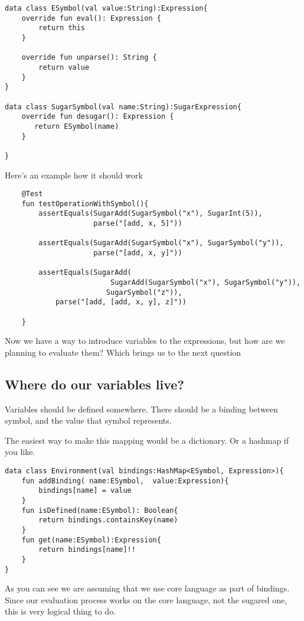 \documentclass[11pt]{article}
\begin{document}
\begin{verbatim}
data class ESymbol(val value:String):Expression{
    override fun eval(): Expression {
        return this
    }

    override fun unparse(): String {
        return value
    }
}

data class SugarSymbol(val name:String):SugarExpression{
    override fun desugar(): Expression {
       return ESymbol(name)
    }

}
\end{verbatim}
Here's an example how it should work
\begin{verbatim}
    @Test
    fun testOperationWithSymbol(){
        assertEquals(SugarAdd(SugarSymbol("x"), SugarInt(5)),
                     parse("[add, x, 5]"))

        assertEquals(SugarAdd(SugarSymbol("x"), SugarSymbol("y")),
                     parse("[add, x, y]"))

        assertEquals(SugarAdd(
                         SugarAdd(SugarSymbol("x"), SugarSymbol("y")),
                        SugarSymbol("z")),
            parse("[add, [add, x, y], z]"))

    }
\end{verbatim}
Now we have a way to introduce variables to the expressions, but how are we planning to evaluate them?
Which brings us to the next question
\subsection{Where do our variables live?}
\label{sec:orgc83e356}
Variables should be defined somewhere. There should be a binding between symbol, and the value that symbol represents.

The easiest way to make this mapping would be a dictionary. Or a hashmap if you like.

\begin{verbatim}
data class Environment(val bindings:HashMap<ESymbol, Expression>){
    fun addBinding( name:ESymbol,  value:Expression){
        bindings[name] = value
    }
    fun isDefined(name:ESymbol): Boolean{
        return bindings.containsKey(name)
    }
    fun get(name:ESymbol):Expression{
        return bindings[name]!!
    }
}
\end{verbatim}
As you can see we are assuming that we use core language as part of bindings.
Since our evaluation process works on the core language, not the sugared one, this is very logical thing to do.
\end{document}
